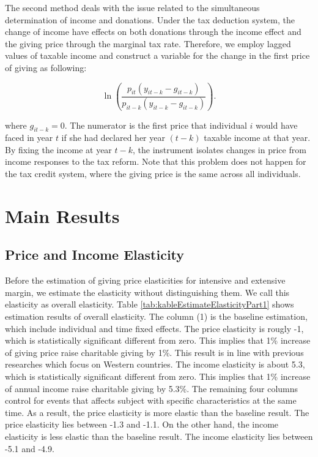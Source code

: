 \documentclass[ review  , 3p ]{elsarticle}
\begin{document}
  The second method deals with the issue related to the simultaneous determination of income and donations.
  Under the tax deduction system,
  the change of income have effects on both donations through the income effect and the giving price through the marginal tax rate.
  Therefore, we employ lagged values of taxable income and construct a variable for the change in the first price of giving as following:

  \[
  \ln \left(\frac{p_{it}(y_{it-k} - g_{it-k})}{p_{it-k}(y_{it-k} - g_{it-k})}\right).
  \]

  where \(g_{it-k} = 0\).
  The numerator is the first price that individual \(i\) would have faced in year \(t\) if she had declared her year \((t - k)\) taxable income at that year.
  By fixing the income at year \(t - k\),
  the instrument isolates changes in price from income responses to the tax reform.
  Note that this problem does not happen for the tax credit system, where the giving price is the same across all individuals.

  \hypertarget{main-results}{%
  \section{Main Results}\label{main-results}}

  \hypertarget{price-and-income-elasticity}{%
  \subsection{Price and Income Elasticity}\label{price-and-income-elasticity}}

  Before the estimation of giving price elasticities for intensive and extensive margin, we estimate the elasticity without distinguishing them. We call this elasticity as overall elasticity.
  Table \ref{tab:kableEstimateElasticityPart1} shows estimation results of overall elasticity.
  The column (1) is the baseline estimation, which include individual and time fixed effects.
  The price elasticity is rougly -1, which is statistically significant different from zero.
  This implies that 1\% increase of giving price raise charitable giving by 1\%.
  This result is in line with previous researches which focus on Western countries.
  The income elasticity is about 5.3, which is statistically significant different from zero.
  This implies that 1\% increase of annual income raise charitable giving by 5.3\%.
  The remaining four columns control for events that affects subject with specific characteristics at the same time.
  As a result, the price elasticity is more elastic than the baseline result.
  The price elasticity lies between -1.3 and -1.1.
  On the other hand, the income elasticity is less elastic than the baseline result.
  The income elasticity lies between -5.1 and -4.9.
\end{document}
